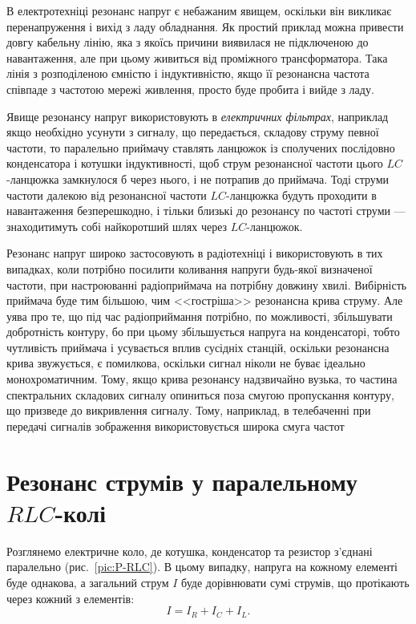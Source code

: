 \noindent\bigskip%
\begin{More}

    В електротехніці резонанс напруг є небажаним явищем, оскільки він викликає перенапруження і вихід з ладу обладнання. Як простий приклад можна привести довгу кабельну лінію, яка з якоїсь причини виявилася не підключеною до навантаження, але при цьому живиться від проміжного трансформатора. Така лінія з розподіленою ємністю і індуктивністю, якщо її резонансна частота співпаде з частотою мережі живлення, просто буде пробита і вийде з ладу.

	Явище резонансу напруг використовують в \emph{електричних фільтрах}, наприклад якщо необхідно усунути з сигналу, що передається, складову струму певної частоти, то паралельно приймачу ставлять ланцюжок із сполучених послідовно конденсатора і котушки індуктивності, щоб струм резонансної частоти цього $LC$-ланцюжка замкнулося б через нього, і не потрапив до приймача. Тоді струми частоти далекою від резонансної частоти $LC$-ланцюжка будуть проходити в навантаження безперешкодно, і тільки близькі до резонансу по частоті струми --- знаходитимуть собі найкоротший шлях через $LC$-ланцюжок.

	Резонанс напруг широко застосовують в радіотехніці і використовують в тих випадках, коли потрібно посилити коливання напруги будь-якої визначеної частоти, при настроюванні радіоприймача на потрібну довжину хвилі. Вибірність приймача буде тим більшою, чим <<гостріша>> резонансна крива струму. Але уява про те, що під час радіоприймання потрібно, по можливості, збільшувати добротність контуру, бо при цьому збільшується напруга на конденсаторі, тобто чутливість приймача і усувається вплив сусідніх станцій, оскільки резонансна крива звужується, є помилкова, оскільки сигнал ніколи не буває ідеально монохроматичним. Тому, якщо крива резонансу надзвичайно вузька, то частина спектральних складових сигналу опиниться поза смугою пропускання контуру, що призведе до викривлення сигналу. Тому, наприклад, в телебаченні при передачі сигналів зображення використовується широка смуга частот 

\end{More}

\section{Резонанс струмів у паралельному $RLC$-колі}

Розглянемо електричне коло, де котушка, конденсатор та резистор з'єднані паралельно (рис.~\ref{pic:P-RLC}). В цьому випадку, напруга на кожному елементі буде однакова, а загальний струм $I$ буде дорівнювати сумі струмів, що протікають через кожний з елементів:
\begin{equation}
	I = I_R + I_C +I_L.
\end{equation}


